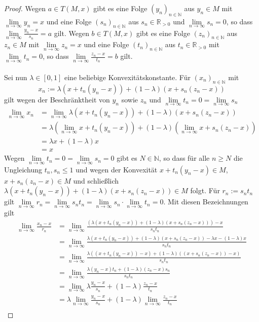 \begin{compactenum}[(i)]
\begin{proof}
Wegen $a\in T(M,x)$ gibt es eine Folge $(y_n)_{n\in\mathbb N}$ aus $y_n\in M$ mit $\lim\limits_{n\to\infty} y_n=x$ und eine Folge $(s_n)_{n\in\mathbb N}$ aus $s_n\in\mathbb R_{>0}$ und $\lim\limits_{n\to\infty}s_n = 0$, so dass $\lim\limits_{n\to\infty} \frac{y_n-x}{s_n}=a$ gilt. Wegen $b\in T(M,x)$ gibt es eine Folge $(z_n)_{n\in\mathbb N}$ aus $z_n\in M$ mit $\lim\limits_{n\to\infty} z_n=x$ und eine Folge $(t_n)_{n\in\mathbb N}$ aus $t_n\in\mathbb R_{>0}$ mit $\lim\limits_{n\to\infty}t_n = 0$, so dass $\lim\limits_{n\to\infty} \frac{z_n-x}{t_n}=b$ gilt.\\\\
Sei nun $\lambda\in[0,1]$ eine beliebige Konvexitätskonstante. Für $(x_n)_{n\in\mathbb N}$ mit $$x_n:=\lambda(x+t_n(y_n-x))+(1-\lambda)(x+s_n(z_n-x))$$ gilt wegen der Beschränktheit von $y_n$ sowie $z_n$ und $\lim\limits_{n\to\infty}t_n = 0=\lim\limits_{n\to\infty}s_n$
\begin{align*}
\lim\limits_{n\to\infty} x_n &=\lim\limits_{n\to\infty} \lambda(x+t_n(y_n-x))+(1-\lambda)(x+s_n(z_n-x))\\&=\lambda(\lim\limits_{n\to\infty}x+t_n(y_n-x))+(1-\lambda)(\lim\limits_{n\to\infty} x+s_n(z_n-x))\\&=\lambda x+(1-\lambda)x&\\
&=x
\end{align*}
Wegen $\lim\limits_{n\to\infty} t_n=0=\lim\limits_{n\to\infty} s_n=0$ gibt es $N\in\mathbb N$, so dass für alle $n\geq N$ die Ungleichung $t_n,s_n\leq 1$ und wegen der Konvexität $x+t_n(y_n-x)\in M$,  $x+s_n(z_n-x)\in M$ und schließlich $\lambda(x+t_n(y_n-x))+(1-\lambda)(x+s_n(z_n-x))\in M$ folgt. Für $r_n:=s_nt_n$ gilt $\lim\limits_{n\to\infty} r_n=\lim\limits_{n\to\infty} s_nt_n=\lim\limits_{n\to\infty} s_n\cdot \lim\limits_{n\to\infty}t_n=0$. Mit diesen Bezeichnungen gilt \begin{align*}\lim\limits_{n\to\infty}\frac{x_n-x}{r_n}&=\lim\limits_{n\to\infty}\frac{(\lambda(x+t_n(y_n-x))+(1-\lambda)(x+s_n(z_n-x)))-x}{s_nt_n}\\&=\lim\limits_{n\to\infty}\frac{\lambda(x+t_n(y_n-x))+(1-\lambda)(x+s_n(z_n-x))-\lambda x-(1-\lambda)x}{s_nt_n}\\&=\lim\limits_{n\to\infty}\frac{\lambda((x+t_n(y_n-x))-x)+(1-\lambda)((x+s_n(z_n-x))-x)}{s_nt_n}\\&=\lim\limits_{n\to\infty}\frac{\lambda(y_n-x)t_n+(1-\lambda)(z_n-x)s_n}{s_nt_n}\\&=\lim\limits_{n\to\infty}\lambda \frac{y_n-x}{s_n}+(1-\lambda)\frac{z_n-x}{t_n}\\&=\lambda \lim\limits_{n\to\infty}\frac{y_n-x}{s_n}+(1-\lambda)\lim\limits_{n\to\infty}\frac{z_n-x}{t_n}\\

\end{align*}
\end{proof}
\end{compactenum}
